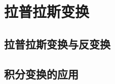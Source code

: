 \chapter{拉普拉斯变换}

% 

\section{拉普拉斯变换与反变换}
\label{sec:laplace_transform_and_inverse_transform}



\section{积分变换的应用}
\label{sec:integral_transform_applications}
